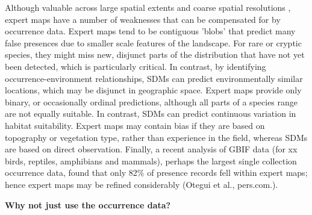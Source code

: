 Although valuable across large spatial extents and coarse spatial resolutions \citep{Hurlbert:2007bh}, expert maps have a number of weaknesses that can be compensated for by occurrence data. Expert maps tend to be contiguous 'blobs' that predict many false presences due to smaller scale features of the landscape. For rare or cryptic species, they might miss new, disjunct parts of the distribution that have not yet been detected, which is particularly critical. In contrast, by identifying occurrence-environment relationships, SDMs can predict environmentally similar locations, which may be disjunct in geographic space. Expert maps provide only binary, or occasionally ordinal predictions, although all parts of a species range are not equally suitable. In contrast, SDMs can predict continuous variation in habitat suitability. Expert maps may contain bias if they are based on topography or vegetation type, rather than experience in the field, whereas SDMs are based on direct observation. Finally, a recent analysis of GBIF data (for xx birds, reptiles, amphibians and mammals), perhaps the largest single collection occurrence data, found that only 82\% of presence records fell within expert maps; hence expert maps may be refined considerably (Otegui et al., pers.com.).  


\textbf{Why not just use the occurrence data?} 

